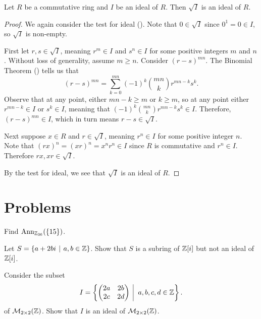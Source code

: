 \begin{proposition}
    Let $R$ be a commutative ring and $I$ be an ideal of $R$. Then $\sqrt{I}$ is an ideal of $R$.
\end{proposition}
\begin{proof}
    We again consider the test for ideal (). Note that $0 \in \sqrt{I}$ since $0^1 = 0 \in I$, so $\sqrt{I}$ is non-empty.

    First let $r, s \in \sqrt{I}$, meaning $r^m \in I$ and $s^n \in I$ for some positive integers $m$ and $n$. Without loss of generality, assume $m \geq n$. Consider $(r-s)^{mn}$. The Binomial Theorem () tells us that
    \[
        (r-s)^{mn} = \sum_{k=0}^{mn}(-1)^k{mn \choose k}r^{mn-k}s^k.
    \]
    Observe that at any point, either $mn - k \geq m$ or $k \geq m$, so at any point either $r^{mn-k} \in I$ or $s^k \in I$, meaning that $(-1)^k{mn \choose k}r^{mn-k}s^k \in I$. Therefore, $(r-s)^{mn} \in I$, which in turn means $r-s \in \sqrt{I}$.

    Next suppose $x \in R$ and $r \in \sqrt{I}$, meaning $r^n \in I$ for some positive integer $n$. Note that $(rx)^n = (xr)^n = x^nr^n \in I$ since $R$ is commutative and $r^n \in I$. Therefore $rx, xr \in \sqrt{I}$.

    By the test for ideal, we see that $\sqrt{I}$ is an ideal of $R$.
\end{proof}

\newpage

\section{Problems}
\begin{problem}
    Find $\mathrm{Ann}_{\mathbb{Z}_{36}}(\{15\})$.
\end{problem}

\begin{problem}
    Let $S = \{a + 2bi \vert a, b \in \Z\}$. Show that $S$ is a subring of $\mathbb{Z}[i]$ but not an ideal of $\mathbb{Z}[i]$.
\end{problem}

\begin{problem}
    Consider the subset
    \[
        I = \left\{\begin{pmatrix}2a&2b\\2c&2d\end{pmatrix} \vert a,b,c,d \in \Z\right\}.
    \]
    of $\mathcal{M}_{2\times2}(\mathbb{Z})$. Show that $I$ is an ideal of $\mathcal{M}_{2\times2}(\mathbb{Z})$.
\end{problem}

